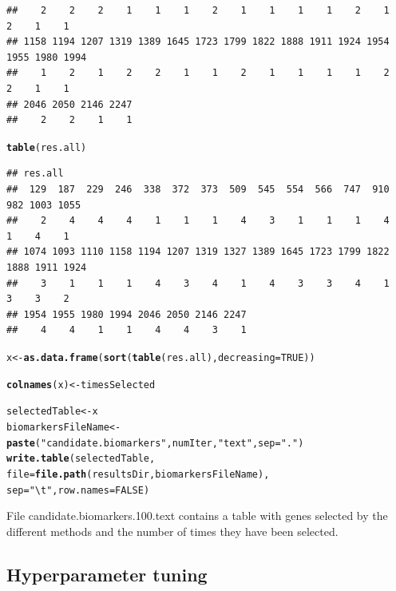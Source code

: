 \documentclass{article}\usepackage[]{graphicx}\usepackage[]{color}
\makeatletter
\newcommand{\hlnum}[1]{\textcolor[rgb]{0.686,0.059,0.569}{#1}}%
\newcommand{\hlstr}[1]{\textcolor[rgb]{0.192,0.494,0.8}{#1}}%
\newcommand{\hlstd}[1]{\textcolor[rgb]{0.345,0.345,0.345}{#1}}%
\newcommand{\hlkwb}[1]{\textcolor[rgb]{0.69,0.353,0.396}{#1}}%
\newcommand{\hlkwc}[1]{\textcolor[rgb]{0.333,0.667,0.333}{#1}}%
\newcommand{\hlkwd}[1]{\textcolor[rgb]{0.737,0.353,0.396}{\textbf{#1}}}%
\newenvironment{kframe}{%
 \def\at@end@of@kframe{}%
 \ifinner\ifhmode%
  \def\at@end@of@kframe{\end{minipage}}%
  \begin{minipage}{\columnwidth}%
 \fi\fi%
 \def\FrameCommand##1{\hskip\@totalleftmargin \hskip-\fboxsep
 \colorbox{shadecolor}{##1}\hskip-\fboxsep
     \hskip-\linewidth \hskip-\@totalleftmargin \hskip\columnwidth}%
 \MakeFramed {\advance\hsize-\width
   \@totalleftmargin\z@ \linewidth\hsize
   \@setminipage}}%
 {\par\unskip\endMakeFramed%
 \at@end@of@kframe}
\newenvironment{knitrout}{}{} %
\makeatother
\begin{document}
\begin{knitrout}
\begin{kframe}
\begin{verbatim}
##    2    2    2    1    1    1    2    1    1    1    1    2    1    2    1    1 
## 1158 1194 1207 1319 1389 1645 1723 1799 1822 1888 1911 1924 1954 1955 1980 1994 
##    1    2    1    2    2    1    1    2    1    1    1    1    2    2    1    1 
## 2046 2050 2146 2247 
##    2    2    1    1
\end{verbatim}
\begin{alltt}
\hlkwd{table}\hlstd{(res.all)}
\end{alltt}
\begin{verbatim}
## res.all
##  129  187  229  246  338  372  373  509  545  554  566  747  910  982 1003 1055 
##    2    4    4    4    1    1    1    4    3    1    1    1    4    1    4    1 
## 1074 1093 1110 1158 1194 1207 1319 1327 1389 1645 1723 1799 1822 1888 1911 1924 
##    3    1    1    1    4    3    4    1    4    3    3    4    1    3    3    2 
## 1954 1955 1980 1994 2046 2050 2146 2247 
##    4    4    1    1    4    4    3    1
\end{verbatim}
\begin{alltt}
\hlstd{x}\hlkwb{<-}\hlkwd{as.data.frame}\hlstd{(}\hlkwd{sort}\hlstd{(}\hlkwd{table}\hlstd{(res.all),} \hlkwc{decreasing}\hlstd{=}\hlnum{TRUE}\hlstd{))}

\hlkwd{colnames}\hlstd{(x)} \hlkwb{<-} \hlstd{timesSelected}
\end{alltt}


{\ttfamily\noindent\bfseries\color{errorcolor}{\#\# Error in eval(expr, envir, enclos): object 'timesSelected' not found}}\begin{alltt}
\hlstd{selectedTable} \hlkwb{<-} \hlstd{x}
\hlstd{biomarkersFileName} \hlkwb{<-} \hlkwd{paste}\hlstd{(}\hlstr{"candidate.biomarkers"}\hlstd{, numIter,} \hlstr{"text"}\hlstd{,} \hlkwc{sep}\hlstd{=}\hlstr{"."}\hlstd{)}
\hlkwd{write.table}\hlstd{(selectedTable,}
            \hlkwc{file}\hlstd{=}\hlkwd{file.path}\hlstd{(resultsDir, biomarkersFileName),}
            \hlkwc{sep}\hlstd{=}\hlstr{"\textbackslash{}t"}\hlstd{,} \hlkwc{row.names}\hlstd{=}\hlnum{FALSE}\hlstd{)}
\end{alltt}
\end{kframe}
\end{knitrout}

File candidate.biomarkers.100.text contains a table with genes selected by the different methods and the number of times they have been selected.

\subsection{Hyperparameter tuning}
\end{document}
